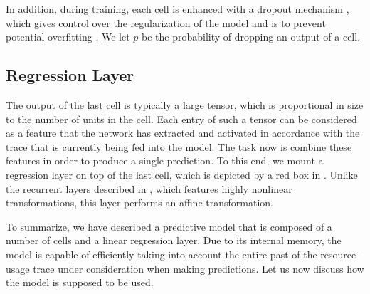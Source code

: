 In addition, during training, each cell is enhanced with a dropout mechanism
\cite{zaremba2014}, which gives control over the regularization of the model and
is to prevent potential overfitting \cite{hastie2009}. We let $p$ be the
probability of dropping an output of a cell.

\subsection{Regression Layer}
The output of the last cell is typically a large tensor, which is proportional
in size to the number of units in the cell. Each entry of such a tensor can be
considered as a feature that the network has extracted and activated in
accordance with the trace that is currently being fed into the model. The task
now is combine these features in order to produce a single prediction. To this
end, we mount a regression layer on top of the last cell, which is depicted by a
red box in . Unlike the recurrent layers described in
, which features highly nonlinear transformations, this layer
performs an affine transformation.

To summarize, we have described a predictive model that is composed of a number
of  cells and a linear regression layer. Due to its internal memory,
the model is capable of efficiently taking into account the entire past of the
resource-usage trace under consideration when making predictions. Let us now
discuss how the model is supposed to be used.
